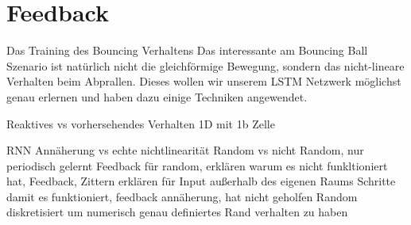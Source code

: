 \section{Feedback}



Das Training des Bouncing Verhaltens
Das interessante am Bouncing Ball Szenario ist natürlich nicht die gleichförmige Bewegung, sondern das nicht-lineare Verhalten beim Abprallen. Dieses wollen wir unserem LSTM Netzwerk möglichst genau erlernen und haben dazu einige Techniken angewendet. 

Reaktives vs vorhersehendes Verhalten
1D mit 1b Zelle

RNN Annäherung vs echte nichtlinearität
Random vs nicht Random, nur periodisch gelernt
Feedback für random, erklären warum es nicht funkltioniert hat,
Feedback, Zittern erklären für Input außerhalb des eigenen Raums
Schritte damit es funktioniert, feedback annäherung, hat nicht geholfen
Random diskretisiert um numerisch genau definiertes Rand verhalten zu haben